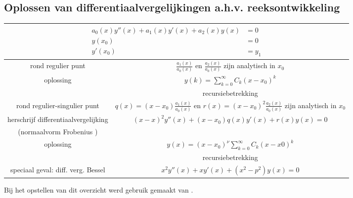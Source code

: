 \documentclass[10pt,a4paper]{article}
\begin{document}
\subsection{Oplossen van differentiaalvergelijkingen a.h.v. reeksontwikkeling}
\begin{center}
	\centering
	{\tabulinesep=1.5mm
		\begin{tabu}{|c|c|} 
			\hline
{} \\ \hline

rond regulier punt & $\frac{a_1(x)}{a_0(x)}$ en $\frac{a_2(x)}{a_0(x)}$ zijn analytisch in $x_0$ \\ 
	 oplossing & $y(k) = \sum_{k=0}^{\infty} C_k (x-x_0)^k$ \\
	 & recursiebetrekking \\ \hline
	
rond regulier-singulier punt &  $q(x) = (x-x_0)\frac{a_1(x)}{a_0(x)}$ en $r(x) = (x-x_0)^2\frac{a_2(x)}{a_0(x)}$ zijn analytisch in $x_0$ \\
	herschrijf differentiaalvergelijking & $(x-x)^2y''(x) + (x-x_0)q(x)y'(x) + r(x)y(x) = 0$ \\ 
	(normaalvorm Frobenius ) & \\ 
	oplossing & $y(x) = (x-x_0)^{\nu} \sum_{k=0}^{\infty} C_k (x-x0)^k$ \\
	& recursiebetrekking \\ \hline

speciaal geval: diff. verg. Bessel  & $x^2 y''(x) + xy'(x) + (x^2 - p^2)y(x) = 0$ \\ \hline

	\end{tabu}}
\end{center}


Bij het opstellen van dit overzicht werd gebruik gemaakt van \cite{VandewalleStefan2017AIS}.




\end{document}
